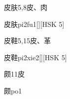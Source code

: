 \begin{entry}{皮肤}{5,8}{⽪、⾁}
  \begin{phonetics}{皮肤}{pi2fu1}[][HSK 5]
  \end{phonetics}
\end{entry}

\begin{entry}{皮鞋}{5,15}{⽪、⾰}
  \begin{phonetics}{皮鞋}{pi2xie2}[][HSK 5]
  \end{phonetics}
\end{entry}

\begin{entry}{颇}{11}{⽪}
  \begin{phonetics}{颇}{po1}
  \end{phonetics}
\end{entry}


